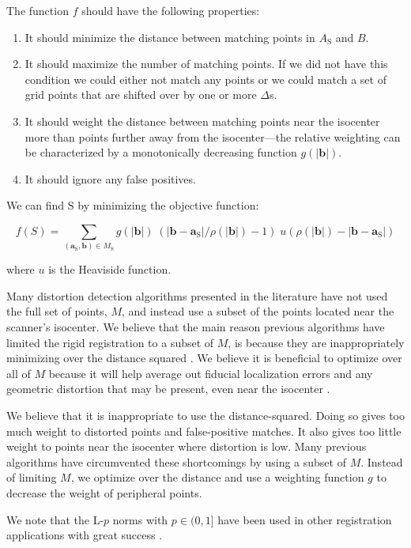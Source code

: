 \documentclass[12pt]{article}
\begin{document}
The function $f$ should have the following properties:

\begin{enumerate}
\item It should minimize the distance between matching points in $A_\mathrm{S}$ and $B$.
\item It should maximize the number of matching points.  If we did not have this condition we could either not match any points or we could match a set of grid points that are shifted over by one or more $\Delta$s.
\item It should weight the distance between matching points near the isocenter more than points further away from the isocenter---the relative weighting can be characterized by a monotonically decreasing function $g(|\mathbf{b}|)$.
\item It should ignore any false positives.
\end{enumerate}

We can find $\mathrm{S}$ by minimizing the objective function:

$$
f(S) =
\sum_{(\textbf{a}_\textrm{S}, \textbf{b}) \in M_\textrm{S}} g(\left|\mathbf{b}\right|)
\;
(\left|\mathbf{b} - \mathbf{a}_\textrm{S}\right|/\rho(|\mathbf{b}|) - 1)
\;
u(\rho(|\mathbf{b}|) - \left|\mathbf{b} - \mathbf{a}_\textrm{S}\right|)
$$

where $u$ is the Heaviside function.

Many distortion detection algorithms presented in the literature have not used the full set of points, $M$, and instead use a subset of the points located near the scanner's isocenter.  We believe that the main reason previous algorithms have limited the rigid registration to a subset of $M$, is because they are inappropriately minimizing over the distance squared \cite{wang2005}.  We believe it is beneficial to optimize over all of $M$ because it will help average out fiducial localization errors and any geometric distortion that may be present, even near the isocenter \cite{baldwin2007}.

We believe that it is inappropriate to use the distance-squared.  Doing so gives too much weight to distorted points and false-positive matches.  It also gives too little weight to points near the isocenter where distortion is low.  Many previous algorithms have circumvented these shortcomings by using a subset of $M$.  Instead of limiting $M$, we optimize over the distance and use a weighting function $g$ to decrease the weight of peripheral points.

We note that the L-$p$ norms with $p \in (0, 1]$ have been used in other registration applications with great success \cite{bouaziz2013}.  
\end{document}

